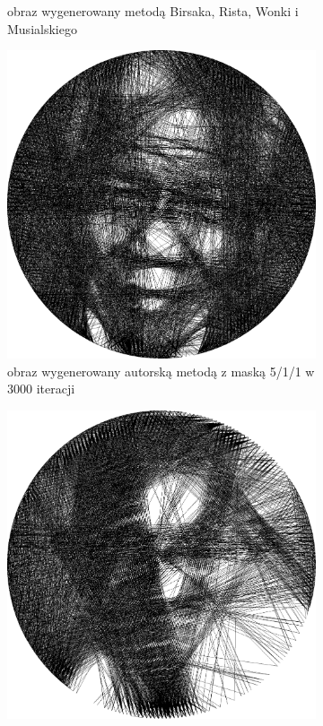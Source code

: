 \begin{figure}[H]
\begin{subfigure}{0.24\textwidth}
            \caption{obraz wygenerowany metodą Birsaka, Rista, Wonki i Musialskiego}
            \label{comp-comp-gandhi-mandela-f}
        \end{subfigure}
        \begin{subfigure}{0.24\textwidth}
            \centering
            \includegraphics[width = \textwidth]{img/6-comp/mandela_e_i3000_c15_inv0_bg5_obj1_ed1.png}
            \caption{obraz wygenerowany autorską metodą z maską 5/1/1 w 3000 iteracji}
            \label{comp-comp-gandhi-mandela-g}
        \end{subfigure}
        \begin{subfigure}{0.24\textwidth}
            \centering
            \includegraphics[width = \textwidth]{img/6-comp/gandhi_e_i2000_c20_inv0_bg10_obj1_ed10.png}

\end{subfigure}
\end{figure}
